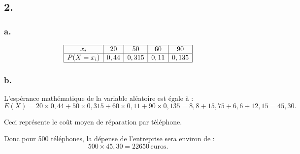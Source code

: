 \documentclass[10pt]{article}
\begin{document}
	
	\subsection*{2.}
	
	\subsubsection*{a.}
	

	\[
	\begin{array}{|c|c|c|c|c|}
		\hline	x_i & 20 & 50 & 60 & 90 \\
		\hline
		P(X = x_i) & 0,44 & 0,315 & 0,11 & 0,135 \\
			\hline
	\end{array}
	\]
	
	\subsubsection*{b.}
	
	L'espérance mathématique de la variable aléatoire est égale à :
	\[
	E(X) = 20 \times 0,44 + 50 \times 0,315 + 60 \times 0,11 + 90 \times 0,135 = 8,8 + 15,75 + 6,6 + 12,15 = 45,30.
	\]
	
	Ceci représente le coût moyen de réparation par téléphone.
	
	Donc pour 500 téléphones, la dépense de l'entreprise sera environ de :
	\[
	500 \times 45,30 = 22 650 \, \text{euros}.
	\]
\end{document}
